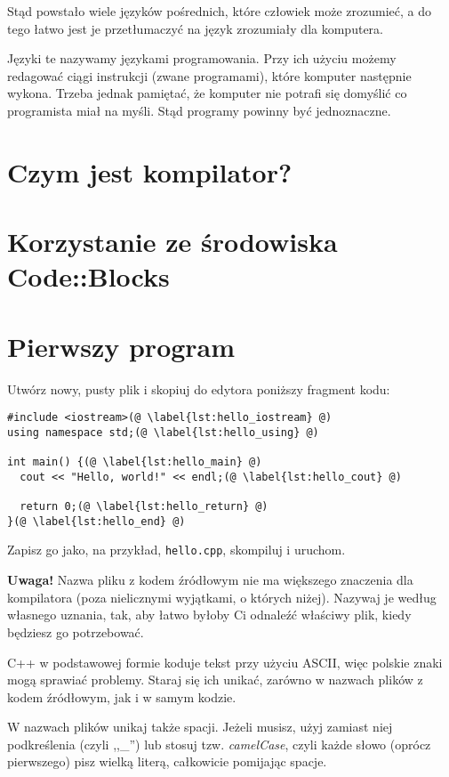\documentclass[11pt]{book}
\newenvironment{notice}
{ \vspace{1em} \noindent
  \definecolor{shadecolor}{RGB}{255,240,158}
  \begin{minipage}{\textwidth} 
  \begin{shaded} \textbf{Uwaga!} }
{ \end{shaded} 
  \end{minipage} 
  \vspace{1em} }
\begin{document}
Stąd powstało wiele języków pośrednich, które człowiek może zrozumieć, a do
tego łatwo jest je przetłumaczyć na język zrozumiały dla komputera.

Języki te nazywamy językami programowania. Przy ich użyciu możemy redagować
ciągi instrukcji (zwane programami), które komputer następnie wykona. Trzeba 
jednak pamiętać, że komputer nie potrafi się domyślić co programista miał na 
myśli. Stąd programy powinny być jednoznaczne.

\section{Czym jest kompilator?}
\section{Korzystanie ze środowiska Code::Blocks}
\section{Pierwszy program}
Utwórz nowy, pusty plik i skopiuj do edytora poniższy fragment kodu:

\begin{lstlisting}[caption={Hello, world!},label={lst:hello}]
#include <iostream>(@ \label{lst:hello_iostream} @)
using namespace std;(@ \label{lst:hello_using} @)

int main() {(@ \label{lst:hello_main} @)
  cout << "Hello, world!" << endl;(@ \label{lst:hello_cout} @)

  return 0;(@ \label{lst:hello_return} @)
}(@ \label{lst:hello_end} @)
\end{lstlisting}

Zapisz go jako, na przykład, \texttt{hello.cpp}, skompiluj i uruchom.

\begin{notice}
Nazwa pliku z kodem źródłowym nie ma większego znaczenia dla kompilatora
(poza nielicznymi wyjątkami, o których niżej). Nazywaj je według własnego
uznania, tak, aby łatwo byłoby Ci odnaleźć właściwy plik, kiedy będziesz go
potrzebować.

C++ w podstawowej formie koduje tekst przy użyciu ASCII, więc polskie znaki
mogą sprawiać problemy. Staraj się ich unikać, zarówno w nazwach plików z kodem 
źródłowym, jak i w samym kodzie.

W nazwach plików unikaj także spacji. Jeżeli musisz, użyj zamiast niej
podkreślenia (czyli ,,\_'') lub stosuj tzw. \textit{camelCase}, czyli
każde słowo (oprócz pierwszego) pisz wielką literą, całkowicie pomijając spacje.
\end{notice}
\end{document}
